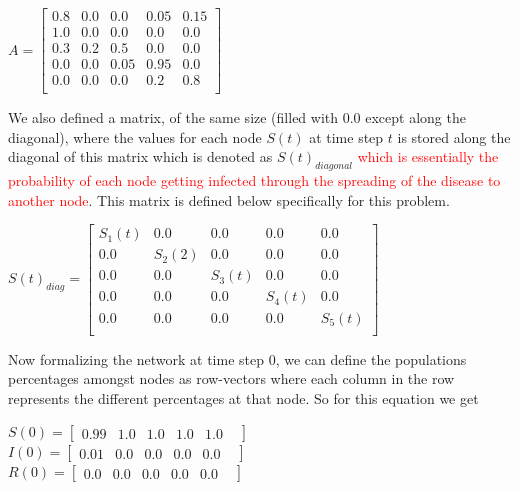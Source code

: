 \documentclass[11pt]{article}
\begin{document}
{\begin{enumerate}
\begin{center}
	$A=\begin{bmatrix} 
		0.8  & 0.0 & 0.0 & 0.05 & 0.15 \\
		1.0  & 0.0 & 0.0 & 0.0   & 0.0 \\
		0.3  & 0.2 & 0.5 & 0.0 & 0.0 \\
		0.0  & 0 .0 & 0.05 & 0.95 & 0.0 \\
		0.0  & 0 .0 & 0.0 & 0.2 & 0.8 \\
	\end{bmatrix}$\\
\end{center}
We also defined a matrix, of the same size (filled with 0.0 except along the diagonal), where the values for each node $S(t)$ at time step $t$ is stored along the diagonal of this matrix which is denoted as  $S(t)_{diagonal}$ \textcolor{red}{ which is essentially the probability of each node getting infected through the spreading of the disease to another node}. This matrix is defined below specifically for this problem.\\
\begin{center}
 	$S(t)_{diag}=\begin{bmatrix} 
		S_1(t)  & 0.0 & 0.0 & 0.0 & 0.0 \\
		0.0  & S_2(2) & 0.0 & 0.0   & 0.0 \\
		0.0  & 0.0 & S_3(t) & 0.0 & 0.0 \\
		0.0  & 0 .0 & 0.0 & S_4(t) & 0.0 \\
		0.0  & 0 .0 & 0.0 & 0.0 & S_5(t) \\
	\end{bmatrix}$
\end{center}
Now formalizing the network at time step 0, we can define the populations percentages amongst nodes as row-vectors where each column in the row represents the different percentages at that node.  So for this equation we get\\
\begin{center}
 	$S(0)=\begin{bmatrix} 
		0.99  &
		1.0  &
		1.0  &
		1.0 &
		1.0  &
	\end{bmatrix}$\\
 	$I(0)=\begin{bmatrix} 
		0.01  &
		0.0  &
		0.0  &
		0.0  &
		0.0  &
	\end{bmatrix}$\\
 	$R(0)=\begin{bmatrix} 
		0.0  &
		0.0  &
		0.0  &
		0.0  &
		0.0  &
	\end{bmatrix}$\\

\end{center}
\end{enumerate}}
\end{document}
